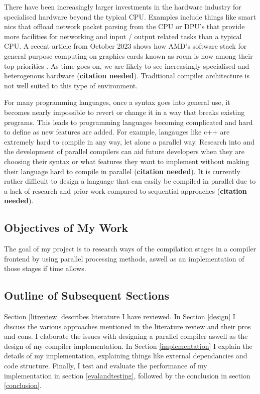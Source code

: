 There have been increasingly larger investments in the hardware industry for
specialised hardware beyond the typical CPU. Examples include things like smart
nics that offload network packet parsing from the CPU or DPU’s that provide
more facilities for networking and input / output related tasks than a typical
CPU. A recent article from October 2023 shows how AMD’s software stack for
general purpose computing on graphics cards known as rocm is now among their top
priorities \citep{ward-foxton_rocm_2023}. As time goes on, we are likely to see increasingly specialised and
heterogenous hardware (\textbf{citation needed}). Traditional compiler architecture is not well suited to
this type of environment.

For many programming languages, once a syntax goes into general use, it becomes
nearly impossible to revert or change it in a way that breaks existing programs.
This leads to programming languages becoming complicated and hard to define as
new features are added. For example, langauges like c++ are extremely hard to
compile in any way, let alone a parallel way. Research into and the development
of parallel compilers can aid future developers when they are choosing their
syntax or what features they want to implement without making their language
hard to compile in parallel (\textbf{citation needed}). It is currently
rather difficult to design a language that can easily be compiled in parallel
due to a lack of research and prior work compared to sequential approaches
(\textbf{citation needed}).

\subsection{Objectives of My Work}

The goal of my project is to research ways of the compilation stages in
a compiler frontend by using parallel processing methods, aswell as an
implementation of those stages if time allows.

\subsection{Outline of Subsequent Sections}

Section \ref{litreview} describes literature I have reviewed. In Section
\ref{design} I discuss the various approaches mentioned in the literature
review and their pros and cons. I elaborate the issues with designing a
parallel compiler aswell as the design of my compiler implementation. In Section
\ref{implementation} I explain the details of my implementation, explaining
things like external dependancies and code structure. Finally, I test and
evaluate the performance of my implementation in section \ref{evalandtesting},
followed by the conclusion in section \ref{conclusion}.